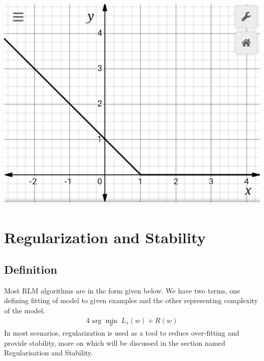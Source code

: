 \documentclass[12pt]{article}
\begin{document}
\begin{center}
    \includegraphics[scale=0.25]{graph.jpg}
\end{center}


\section{Regularization and Stability}
\subsection{Definition}
Most RLM algorithms are in the form given below. We have two terms, one defining fitting of model to given examples and the other representing complexity of the model. 
\begin{alignat*}{4}
   \arg \min_{w}  \;  L_{s}(w) + R(w)
\end{alignat*}
In most scenarios, regularization is used as a tool to reduce over-fitting and provide stability, more on which will be discussed in the section named Regularisation and Stability.
\end{document}
